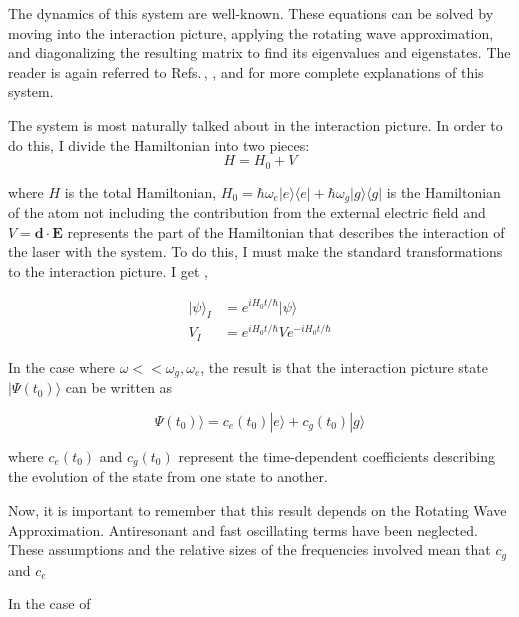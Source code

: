 The dynamics of this system are well-known. These equations can be solved by moving into the interaction picture, applying the rotating wave approximation, and diagonalizing the resulting matrix to find its eigenvalues and eigenstates. The reader is again referred to Refs.\,\cite{cohenTannoudji}, \cite{demilleBudkerKimball}, and \cite{Young1997363} for more complete explanations of this system. 

The system is most naturally talked about in the interaction picture. In order to do this, I divide the Hamiltonian into two pieces: 
\begin{equation}
H=H_0+V
\end{equation} 

where $H$ is the total Hamiltonian, $H_0=\hbar \omega_e |e\rangle\langle e| + \hbar \omega_g|g\rangle\langle g|$ is the Hamiltonian of the atom not including the contribution from the external electric field and $V=\mathbf{d}\cdot\mathbf{E}$ represents the part of the Hamiltonian that describes the interaction of the laser with the system. To do this, I must make the standard transformations to the interaction picture. I get \cite{merzbacher} \cite{sakurai}, 

\begin{align}
|\psi\rangle_I &= e^{i H_0 t/\hbar} |\psi \rangle \\
V_I &= e^{i H_0 t/\hbar} V e^{-i H_0 t/\hbar}
\end{align}

In the case where $\omega<<\omega_g,\omega_e$, the result is that the interaction picture state $|\Psi (t_0)\rangle$ can be written as 

\begin{equation}
\Psi (t_0)\rangle = c_e(t_0) |e\rangle + c_g(t_0) |g\rangle
\end{equation}

where $c_e(t_0)$ and $c_g(t_0)$ represent the time-dependent coefficients describing the evolution of the state from one state to another. 

Now, it is important to remember that this result depends on the Rotating Wave Approximation. Antiresonant and fast oscillating terms have been neglected. These assumptions and the relative sizes of the frequencies involved mean that $c_g$ and $c_e$



In the case of 


